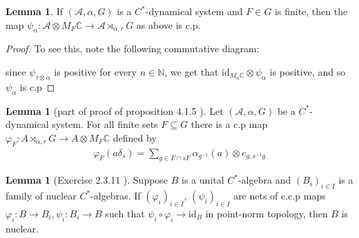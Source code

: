\documentclass[10pt,oneside,openany,final]{memoir}
\theoremstyle{definition}
\newtheorem{lemma}[theorem]{Lemma}
\theoremstyle{Break}
\newcommand{\C}{\mathbb{C}}
\newcommand{\N}{\mathbb{N}}
\newcommand{\A}{\mathcal{A}}
\begin{document}
\begin{lemma}
If $(\A, \alpha, G)$ is a $C^*$-dynamical system and $F \in G$ is finite, then the map $\psi_{\alpha} \colon \A \otimes M_{F} \C \to \A \rtimes_{\alpha,r}G$ as above is c.p.
\begin{proof}
To see this, note the following commutative diagram:

\begin{center}
\end{center}
since $\psi_{\tau \otimes \alpha}$ is positive for every $n \in \N$, we get that $\text{id}_{M_{n}\C} \otimes \psi_{\alpha}$ is positive, and so $\psi_{\alpha}$ is c.p
\end{proof}
\end{lemma}
\begin{lemma}[part of proof of proposition 4.1.5 \text{[BO]}]
Let $(\A,\alpha,G)$ be a $C^*$-dynamical system. For all finite sets $F \subseteq G$ there is a c.p map $\varphi_{F} \colon A \rtimes_{\alpha,r} G \to A \otimes M_{F} \C$ defined by
\begin{align*}
\varphi_{F} (a \delta_{s}) = \sum_{g \in F \cap sF} \alpha_{g^{-1}}(a) \otimes e_{g,s^{-1}g}
\end{align*}
\end{lemma}
\begin{lemma}[Exercise 2.3.11 \text{[BO]}]
Suppose $B$ is a unital $C^*$-algebra and $(B_{i})_{i \in I}$ is a family of nuclear $C^*$-algebras. If $(\varphi_{i})_{i \in I}$, $(\psi_{i})_{i \in I}$  are nets of c.c.p maps $\varphi_{i} \colon B \to B_{i}, \psi_{i} \colon B_{i} \to B$ such that $\psi_{i} \circ \varphi_{i} \to \text{id}_{B}$ in point-norm topology, then $B$ is nuclear.
\end{lemma}
\end{document}
